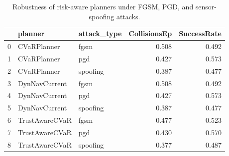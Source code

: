 \begin{table}
\caption{Robustness of risk-aware planners under FGSM, PGD, and sensor-spoofing attacks.}
\label{tab:attack}
\begin{tabular}{lllrr}
\toprule
 & planner & attack\_type & CollisionsEp & SuccessRate \\
\midrule
0 & CVaRPlanner & fgsm & 0.508 & 0.492 \\
1 & CVaRPlanner & pgd & 0.427 & 0.573 \\
2 & CVaRPlanner & spoofing & 0.387 & 0.477 \\
3 & DynNavCurrent & fgsm & 0.508 & 0.492 \\
4 & DynNavCurrent & pgd & 0.427 & 0.573 \\
5 & DynNavCurrent & spoofing & 0.387 & 0.477 \\
6 & TrustAwareCVaR & fgsm & 0.477 & 0.523 \\
7 & TrustAwareCVaR & pgd & 0.430 & 0.570 \\
8 & TrustAwareCVaR & spoofing & 0.377 & 0.487 \\
\bottomrule
\end{tabular}
\end{table}
